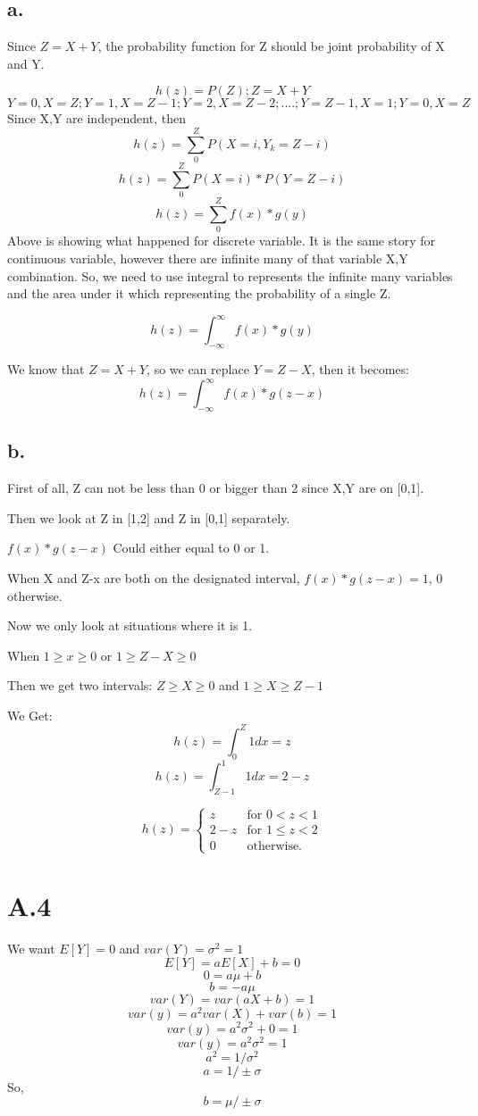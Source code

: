 \documentclass{article}
\begin{document}
\subsection{a.}
Since $Z=X+Y$, the probability function for Z should be joint probability of X and Y.

\[ h(z) = P(Z);Z=X+Y \]
\[ Y=0,X=Z;Y=1,X=Z-1;Y=2,X=Z-2;....;Y=Z-1,X=1;Y=0,X=Z \]
Since X,Y are independent, then
\[h(z)=\sum_0^Z P(X=i,Y_k=Z-i)\]
\[h(z)=\sum_0^Z P(X=i)*P(Y=Z-i)\]
\[h(z)=\sum_0^Z f(x)*g(y)\]
Above is showing what happened for discrete variable. It is the same story for continuous variable, however there are infinite many of that variable X,Y combination. So, we need to use integral to represents the infinite many variables and the area under it which representing the probability of a single Z.  

\[ h(z)=\int_{-\infty}^{\infty} f(x)*g(y) \]

We know that $Z=X+Y$, so we can replace $Y=Z-X$, then it becomes:
\[ h(z)=\int_{-\infty}^{\infty} f(x)*g(z-x) \]

\subsection{b.}
First of all, Z can not be less than 0 or bigger than 2 since X,Y are on [0,1].

Then we look at Z in [1,2] and Z in [0,1] separately.

$f(x)*g(z-x)$ Could either equal to 0 or 1.

When X and Z-x are both on the designated interval, $f(x)*g(z-x)=1$, 0 otherwise.

Now we only look at situations where it is 1. 

When $1\ge x \ge0$ or $1\ge Z-X \ge 0$

Then we get two intervals: $Z\ge X \ge 0$ and $1\ge X \ge Z-1$\newline

We Get:
\[ h(z)=\int_{0}^{Z} 1dx = z\]
\[ h(z)=\int_{Z-1}^{1} 1dx = 2-z\]


\[ 
h(z) = \begin{cases}
z & \text{for $0 < z < 1$} \\
2-z & \text{for $1 \le z < 2$} \\
0 & \text{otherwise.}
\end{cases} 
\]

\section{A.4}
We want $E[Y]=0$ and $var(Y)=\sigma^2=1$
\[ E[Y]=aE[X]+b=0\]
\[ 0=a\mu+b\]
\[ b=-a\mu\]
\[ var(Y) = var(aX+b) =1\]
\[ var(y) = a^2var(X) + var(b)=1\]
\[ var(y) = a^2\sigma^2 + 0=1\]
\[ var(y) = a^2\sigma^2=1\]
\[ a^2 = 1/\sigma^2\]
\[a=1/\pm \sigma\]
So, 
\[b=\mu / \pm \sigma\]
\end{document}

